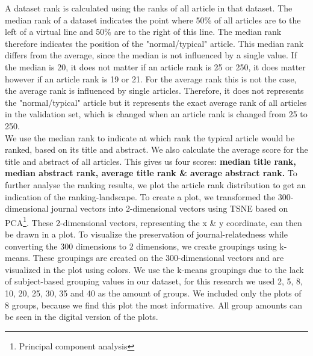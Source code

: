 \documentclass[../../Thesis.tex]{subfiles}
\begin{document}
A dataset rank is calculated using the ranks of all article in that dataset. The median rank of a dataset indicates the point where 50\% of all articles are to the left of a virtual line and 50\% are to the right of this line. The median rank therefore indicates the position of the "normal/typical" article. This median rank differs from the average, since the median is not influenced by a single value. If the median is 20, it does not matter if an article rank is 25 or 250, it does matter however if an article rank is 19 or 21. For the average rank this is not the case, the average rank is influenced by single articles. Therefore, it does not represents the "normal/typical" article but it represents the exact average rank of all articles in the validation set, which is changed when an article rank is changed from 25 to 250.\\
We use the median rank to indicate at which rank the typical article would be ranked, based on its title and abstract. We also calculate the average score for the title and abstract of all articles. This gives us four scores: \textbf{median title rank, median abstract rank, average title rank \& average abstract rank.}
\clearpage
{}
To further analyse the ranking results, we plot the article rank distribution to get an indication of the ranking-landscape.
To create a plot, we transformed the 300-dimensional journal vectors into 2-dimensional vectors using TSNE based on PCA\footnote{Principal component analysis}. These 2-dimensional vectors, representing the x \& y coordinate, can then be drawn in a plot. To visualize the preservation of journal-relatedness while converting the 300 dimensions to 2 dimensions, we create groupings using k-means. These groupings are created on the 300-dimensional vectors and are visualized in the plot using colors. We use the k-means groupings due to the lack of subject-based grouping values in our dataset, for this research we used 2, 5, 8, 10, 20, 25, 30, 35 and 40 as the amount of groups. We included only the plots of 8 groups, because we find this plot the most informative. All group amounts can be seen in the digital version of the plots.
\end{document}

